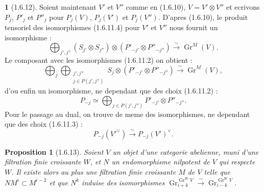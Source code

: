 \documentclass[12pt,a4paper]{article}
\theoremstyle{plain}
\newtheorem{proposition}[theorem]{Proposition}
\theoremstyle{definition}
\theoremstyle{definition}
\newtheorem{para}{}[section]
\theoremstyle{remark}
\DeclareMathOperator{\Gr}{Gr}
\begin{document}
\begin{para}[1.6.12]
Soient maintenant $V'$ et $V''$ comme en (1.6.10), $V = V' \otimes V''$ et ecrivons $P_j$, $P'_j$ et $P''_j$ pour $P_j(V)$, $P_j(V')$ et $P_j(V'')$. D'apres (1.6.10), le produit tensoriel des isomorphismes (1.6.11.4) pour $V'$ et $V''$ nous fournit un isomorphisme :
\[\bigoplus_{j', j''} (S_{j'} \otimes S_{j''}) \otimes (P'_{-j'} \otimes P''_{-j''}) \xrightarrow{\sim} \Gr^M(V).\]
Le composant avec les isomorphismes (1.6.11.2) on obtient :
\[\bigoplus_j \bigoplus_{\substack{j', j'' \\ j \in P(j',j'')}} S_j \otimes (P'_{-j'} \otimes P''_{-j''}) \xrightarrow{\sim} \Gr^M(V),\]
d'ou enfin un isomorphisme, ne dependant que des choix (1.6.11.2) :
\begin{equation}\tag{1.6.12.1}
P_{-j} \simeq \bigoplus_{j \in P(j',j'')} P'_{-j'} \otimes P''_{-j''}.
\end{equation}
Pour le passage au dual, on trouve de meme des isomorphismes, ne dependant que des choix (1.6.11.3) :
\begin{equation}\tag{1.6.12.2}
P_{-j}(V'^\vee) \xrightarrow{\sim} P_{-j}(V')^\vee.
\end{equation}
\end{para}

\begin{proposition}[1.6.13]
Soient $V$ un objet d'une categorie abelienne, muni d'une filtration finie croissante $W$, et $N$ un endomorphisme nilpotent de $V$ qui respecte $W$. Il existe alors au plus une filtration finie croissante $M$ de $V$ telle que $NM^i \subset M^{i-2}$ et que $N^k$ induise des isomorphismes $\Gr_{i+k}^{\Gr^W V} \xrightarrow{\sim} \Gr_{i-k}^{\Gr^W V}$.
\end{proposition}
\end{document}
